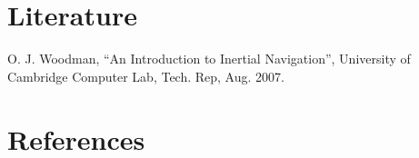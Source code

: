 \section*{Literature} %

O. J. Woodman, “An Introduction to Inertial Navigation”, University of Cambridge Computer Lab, Tech. Rep, Aug. 2007.


\section*{References} %

